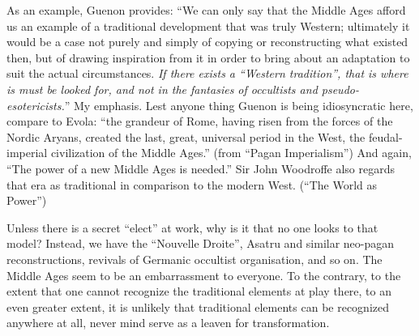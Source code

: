 As an example, Guenon provides: ``We can only say that the Middle Ages afford us an example of a traditional development that was truly Western; ultimately it would be a case not purely and simply of copying or reconstructing what existed then, but of drawing inspiration from it in order to bring about an adaptation to suit the actual circumstances. \emph{If there exists a ``Western tradition'', that is where is must be looked for, and not in the fantasies of occultists and pseudo-esotericists.}'' My emphasis. Lest anyone thing Guenon is being idiosyncratic here, compare to Evola: ``the grandeur of Rome, having risen from the forces of the Nordic Aryans, created the last, great, universal period in the West, the feudal-imperial civilization of the Middle Ages.'' (from ``Pagan Imperialism'') And again, ``The power of a new Middle Ages is needed.'' Sir John Woodroffe also regards that era as traditional in comparison to the modern West. (``The World as Power'')

Unless there is a secret ``elect'' at work, why is it that no one looks to that model? Instead, we have the ``Nouvelle Droite'', Asatru and similar neo-pagan reconstructions, revivals of Germanic occultist organisation, and so on. The Middle Ages seem to be an embarrassment to everyone. To the contrary, to the extent that one cannot recognize the traditional elements at play there, to an even greater extent, it is unlikely that traditional elements can be recognized anywhere at all, never mind serve as a leaven for transformation.

